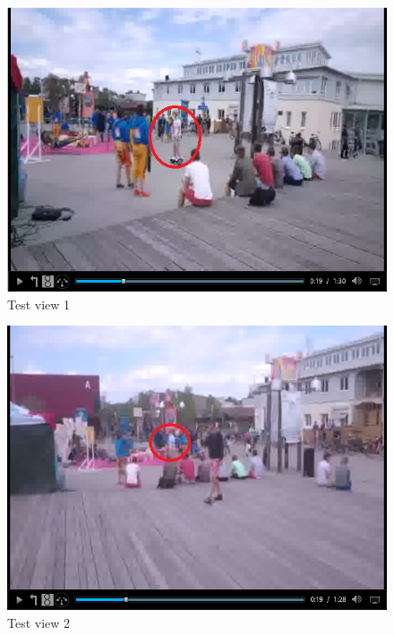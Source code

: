 \begin{figure}[ht!]
\begin{center}
	\includegraphics[scale=0.8]{Hoverboard_1.png}
	\caption{Test view 1}
	\label{fig:testview1}
\end{center}
\end{figure}

\begin{figure}[ht!]
\begin{center}
	\includegraphics[scale=0.8]{Hoverboard_2.png}
	\caption{Test view 2}
	\label{fig:testview2}
\end{center}
\end{figure}